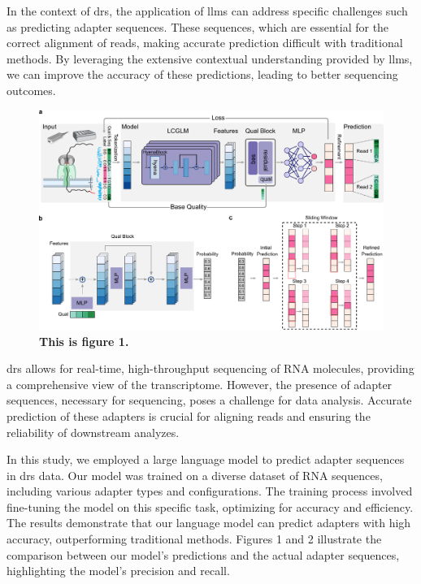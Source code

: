 \documentclass[pdflatex, sn-mathphys-num, lineno]{sn-jnl}%
\theoremstyle{thmstyleone}%
\theoremstyle{thmstyletwo}%
\theoremstyle{thmstylethree}%
\begin{document}
In the context of \gls{drs}, the application of \glspl{llm} can address specific challenges such as predicting adapter sequences.
These sequences, which are essential for the correct alignment of reads, making accurate prediction difficult with traditional methods. By leveraging the extensive contextual understanding provided by \glspl{llm}, we can improve the accuracy of these predictions, leading to better sequencing outcomes.

\begin{figure}[!h]
	\includegraphics[height=0.8\columnwidth]{figures/finals/figure1}
	\caption{\bf This is figure 1.}
	\label{fig:f1}
\end{figure}


\gls{drs} allows for real-time, high-throughput sequencing of RNA molecules, providing a comprehensive view of the transcriptome.
However, the presence of adapter sequences, necessary for sequencing, poses a challenge for data analysis.
Accurate prediction of these adapters is crucial for aligning reads and ensuring the reliability of downstream analyzes.

In this study, we employed a large language model to predict adapter sequences in \gls{drs} data.
Our model was trained on a diverse dataset of RNA sequences, including various adapter types and configurations.
The training process involved fine-tuning the model on this specific task, optimizing for accuracy and efficiency.
The results demonstrate that our language model can predict adapters with high accuracy, outperforming traditional methods.
Figures 1 and 2 illustrate the comparison between our model's predictions and the actual adapter sequences, highlighting the model's precision and recall.
\end{document}
